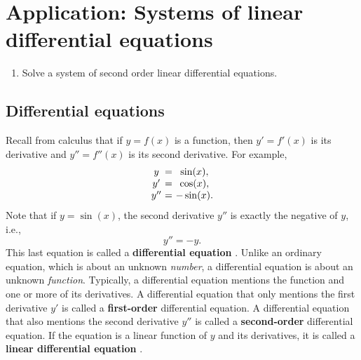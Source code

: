 \section{Application: Systems of linear differential equations}

\begin{outcome}
  \begin{enumerate}
  \item Solve a system of second order linear differential equations.
  \end{enumerate}
\end{outcome}

\subsection{Differential equations}

Recall from calculus that if $y=f(x)$ is a function, then $y' = f'(x)$
is its derivative%
 and $y'' = f''(x)$ is its second derivative.  For
example,
\begin{equation*}
  \begin{array}{c@{~}c@{~}c}
    y &=& \sin(x), \\
    y' &=& \cos(x), \\
    y''&=& -\sin(x). \\
  \end{array}
\end{equation*}
Note that if $y=\sin(x)$, the second derivative $y''$ is exactly the
negative of $y$, i.e.,
\begin{equation*}
  y'' = -y.
\end{equation*}
This last equation is called a \textbf{differential equation}%
%
. Unlike an ordinary equation, which is
about an unknown {\em number}, a differential equation is about an
unknown {\em function}. Typically, a differential equation mentions
the function and one or more of its derivatives. A differential
equation that only mentions the first derivative $y'$ is called a
\textbf{first-order}%
 differential equation. A
differential equation that also mentions the second derivative $y''$
is called a \textbf{second-order}%
 differential equation.
If the equation is a linear function of $y$ and its derivatives, it is
called a \textbf{linear differential equation}%
%
.

